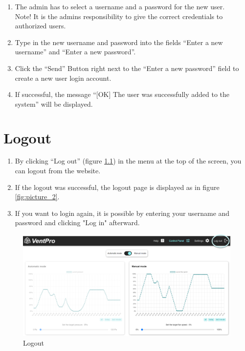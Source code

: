 \begin{enumerate}[wide,  labelwidth=0.3cm,  labelindent=0pt, leftmargin=0.5cm]
\item The admin has to select a username and a password for the new user.\\
\color{red}
Note! It is the admins responsibility to give the correct credentials to authorized users.
\color{black}
\item Type in the new username and password into the fields “Enter a new username” and “Enter a new password”.
\item Click the “Send” Button right next to the “Enter a new password” field to create a new user login account.
\item If successful, the message “[OK] The user was successfully added to the system” will be displayed.
\end{enumerate}



\chapter{Logout}
\label{sec:logout}

\begin{enumerate}[wide,  labelwidth=0.3cm,  labelindent=0pt, leftmargin=0.5cm]
\item By clicking “Log out” (figure \ref{fig:picture_8}) in the menu at the top of the screen, you can logout from the website.
\item If the logout was successful, the logout page is displayed as in figure \ref{fig:picture_2}.
\item If you want to login again, it is possible by entering your username and password and clicking "Log in" afterward.
\end{enumerate}

\vspace{0.5cm}
\begin{figure}[h]
\centering
\includegraphics[width=1.0\textwidth]{img/Picture8}
\caption{Logout}
\label{fig:picture_8}
\end{figure}